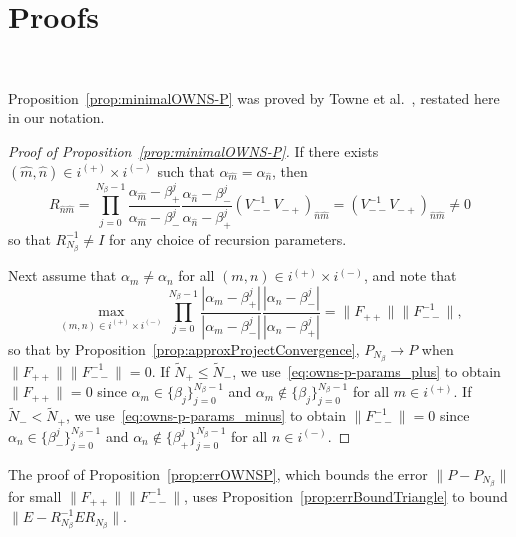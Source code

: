 \section{Proofs}~\label{app:Proofs}

Proposition~\ref{prop:minimalOWNS-P} was proved by Towne et
al.~\cite{Towne_2022_OWNS-P}, restated here in our notation.
\begin{proof}[Proof of Proposition~\ref{prop:minimalOWNS-P}]
    If there exists $(\hat{m},\hat{n})\in i^{(+)}\times i^{(-)}$ such that
    $\alpha_{\hat{m}}=\alpha_{\hat{n}}$, then
    \[
    R_{\hat{n}\hat{m}}
    =
    \prod_{j=0}^{N_\beta-1}\frac{\alpha_{\hat{m}}-\beta_{+}^{j}}
    {\alpha_{\hat{m}}-\beta_-^j}\frac{\alpha_{\hat{n}}-\beta_{-}^{j}}
    {\alpha_{\hat{n}}-\beta_+^j}
    (V_{--}^{-1}V_{-+})_{\hat{n}\hat{m}}
    =
    (V_{--}^{-1}V_{-+})_{\hat{n}\hat{m}}
    \neq 0
    \]
    so that $R_{N_\beta}^{-1}\neq I$ for any choice of recursion parameters.

    Next assume that $\alpha_m\neq\alpha_n$ for all $(m,n)\in i^{(+)}\times
    i^{(-)}$, and note that
    \[
    \max_{(m,n)\in i^{(+)}\times i^{(-)}}\prod_{j=0}^{N_\beta-1}
    \frac{|\alpha_m-\beta_{+}^{j}|}
    {|\alpha_m-\beta_-^j|}
    \frac{|\alpha_n-\beta_{-}^{j}|}
    {|\alpha_n-\beta_+^j|}=\|F_{++}\|\|F_{--}^{-1}\|,
    \]
    so that by Proposition~\ref{prop:approxProjectConvergence},
    $P_{N_\beta}\to P$ when $\|F_{++}\|\|F_{--}^{-1}\|=0$. If
    $\tilde{N}_+\leq \tilde{N}_-$, we use~\eqref{eq:owns-p-params_plus} to
    obtain $\|F_{++}\|=0$ since $\alpha_m\in\{\beta_j\}_{j=0}^{N_\beta-1}$ and
    $\alpha_m\notin\{\beta_j\}_{j=0}^{N_\beta-1}$ for all $m \in i^{(+)}$. If
    $\tilde{N}_- < \tilde{N}_+$, we use~\eqref{eq:owns-p-params_minus} to obtain
    $\|F_{--}^{-1}\|=0$ since $\alpha_n\in\{\beta_-^j\}_{j=0}^{N_\beta-1}$ and
    $\alpha_n\notin\{\beta_+^j\}_{j=0}^{N_\beta-1}$ for all $n\in i^{(-)}$.
\end{proof}


The proof of Proposition~\ref{prop:errOWNSP}, which bounds the error
$\|P-P_{N_\beta}\|$ for small $\|F_{++}\|\|F_{--}^{-1}\|$, uses
Proposition~\ref{prop:errBoundTriangle} to bound
$\|E-R_{N_\beta}^{-1}ER_{N_\beta}\|$.

